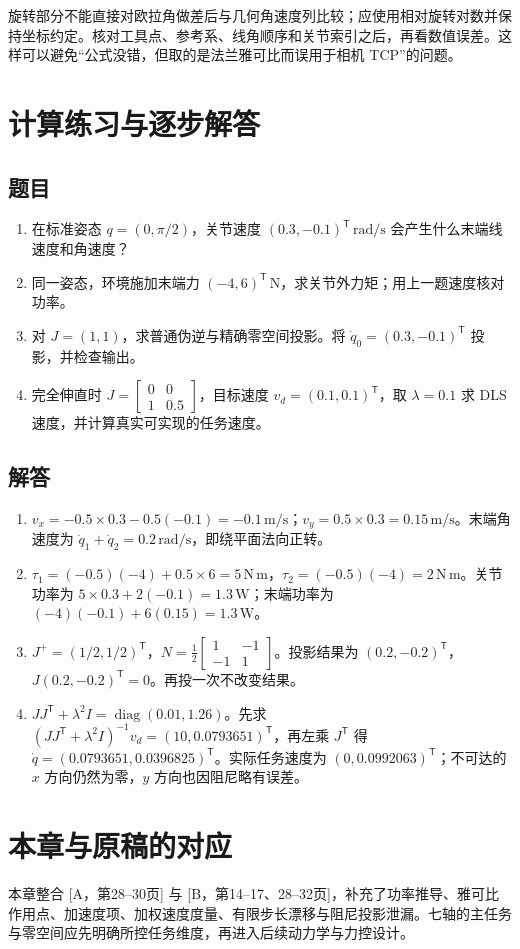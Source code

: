 旋转部分不能直接对欧拉角做差后与几何角速度列比较；应使用相对旋转对数并保持坐标约定。核对工具点、参考系、线角顺序和关节索引之后，再看数值误差。这样可以避免“公式没错，但取的是法兰雅可比而误用于相机 TCP”的问题。

\section{计算练习与逐步解答}
\subsection*{题目}
\begin{enumerate}
\item 在标准姿态 $q=(0,\pi/2)$，关节速度 $(0.3,-0.1)^\mathsf T\,\mathrm{rad/s}$ 会产生什么末端线速度和角速度？
\item 同一姿态，环境施加末端力 $(-4,6)^\mathsf T\,\mathrm N$，求关节外力矩；用上一题速度核对功率。
\item 对 $J=(1,1)$，求普通伪逆与精确零空间投影。将 $\dot q_0=(0.3,-0.1)^\mathsf T$ 投影，并检查输出。
\item 完全伸直时 $J=\begin{bmatrix}0&0\\1&0.5\end{bmatrix}$，目标速度 $v_d=(0.1,0.1)^\mathsf T$，取 $\lambda=0.1$ 求 DLS 速度，并计算真实可实现的任务速度。
\end{enumerate}
\subsection*{解答}
\begin{enumerate}
\item $v_x=-0.5\times0.3-0.5(-0.1)=-0.1\,\mathrm{m/s}$；$v_y=0.5\times0.3=0.15\,\mathrm{m/s}$。末端角速度为 $\dot q_1+\dot q_2=0.2\,\mathrm{rad/s}$，即绕平面法向正转。
\item $\tau_1=(-0.5)(-4)+0.5\times6=5\,\mathrm{N\,m}$，$\tau_2=(-0.5)(-4)=2\,\mathrm{N\,m}$。关节功率为 $5\times0.3+2(-0.1)=1.3\,\mathrm W$；末端功率为 $(-4)(-0.1)+6(0.15)=1.3\,\mathrm W$。
\item $J^+=(1/2,1/2)^\mathsf T$，$N=\frac12\begin{bmatrix}1&-1\\-1&1\end{bmatrix}$。投影结果为 $(0.2,-0.2)^\mathsf T$，$J(0.2,-0.2)^\mathsf T=0$。再投一次不改变结果。
\item $JJ^\mathsf T+\lambda^2I=\operatorname{diag}(0.01,1.26)$。先求 $(JJ^\mathsf T+\lambda^2I)^{-1}v_d=(10,0.0793651)^\mathsf T$，再左乘 $J^\mathsf T$ 得 $\dot q=(0.0793651,0.0396825)^\mathsf T$。实际任务速度为 $(0,0.0992063)^\mathsf T$；不可达的 $x$ 方向仍然为零，$y$ 方向也因阻尼略有误差。
\end{enumerate}

\section*{本章与原稿的对应}
本章整合 [A，第28--30页] 与 [B，第14--17、28--32页]，补充了功率推导、雅可比作用点、加速度项、加权速度度量、有限步长漂移与阻尼投影泄漏。七轴的主任务与零空间应先明确所控任务维度，再进入后续动力学与力控设计。
